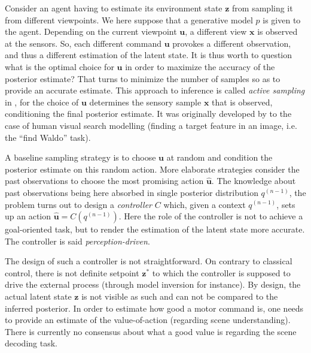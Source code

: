 \documentclass[12pt,twoside,openright]{article}
\begin{document}
Consider an agent having to estimate its environment state $\boldsymbol{z}$ from sampling it from different viewpoints. We here suppose that a generative model $p$ is given to the agent. 
Depending on  the current viewpoint $\boldsymbol{u}$, a different view $\boldsymbol{x}$ is observed at the sensors. So, each different command $\boldsymbol{u}$ provokes a different observation, and thus a different 
estimation of the latent state. It is thus worth to question what is the optimal choice for $\boldsymbol{u}$ in order to maximize the accuracy of the posterior estimate?
That turns  to minimize the number of samples so as to provide an accurate estimate. This approach to inference is called \emph{active sampling} in \citet{friston2012perceptions}, for the choice of $\boldsymbol{u}$ determines the sensory sample $\boldsymbol{x}$ that is observed, conditioning the final posterior estimate. {\color{Purple} It was originally developed by \citet{najemnik2005optimal} to the case of human visual search modelling (finding a target feature in an image, i.e. the ``find Waldo'' task).}

A baseline sampling strategy is to choose $\boldsymbol{u}$ at random and condition the posterior  estimate on this random action. 
More elaborate strategies consider the past observations
to choose the most promising action $\hat{\boldsymbol{u}}$. %
The knowledge about past observations being here absorbed in single posterior distribution $q^{(n-1)}$, the problem turns out to design  a \emph{controller} $C$ which, given a context $q^{(n-1)}$, sets up an action $\hat{\boldsymbol{u}} = C(q^{(n-1)})$. Here the role of the controller is not to achieve a goal-oriented task, but to render the estimation of the latent state more accurate. The controller is said \emph{perception-driven}. 

The design of such a controller is not straightforward. On contrary to classical control, there is not definite setpoint $\boldsymbol{z}^*$ to which the controller is supposed to drive the external process (through model inversion for instance). By design, the actual latent state $\boldsymbol{z}$ is not visible as such and can not be compared to the inferred posterior. In order to estimate how good a motor command is, one needs to provide an estimate of the value-of-action (regarding scene understanding). There is currently no consensus about what a good value is regarding the scene decoding task. 
\end{document}
